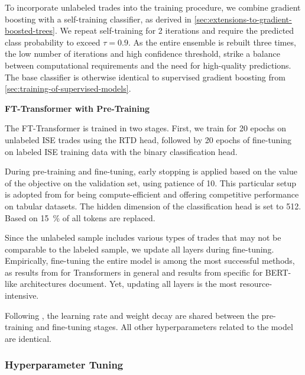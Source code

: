 To incorporate unlabeled trades into the training procedure, we combine gradient boosting with a self-training classifier, as derived in \cref{sec:extensions-to-gradient-boosted-trees}. We repeat self-training for 2 iterations and require the predicted class probability to exceed $\tau=0.9$. As the entire ensemble is rebuilt three times, the low number of iterations and high confidence threshold, strike a balance between computational requirements and the need for high-quality predictions. The base classifier is otherwise identical to supervised gradient boosting from \cref{sec:training-of-supervised-models}.

\textbf{FT-Transformer with Pre-Training}

The FT-Transformer is trained in two stages. First, we train for \num{20} epochs on unlabeled \gls{ISE} trades using the \gls{RTD} head, followed by \num{20} epochs of fine-tuning on labeled \gls{ISE} training data with the binary classification head.

During pre-training and fine-tuning, early stopping is applied based on the value of the objective on the validation set, using patience of \num{10}. This particular setup is adopted from \textcite[\checkmark][15]{rubachevRevisitingPretrainingObjectives2022} for being compute-efficient and offering competitive performance on tabular datasets. The hidden dimension of the classification head is set to \num{512}. Based on \textcite[][3]{clarkElectraPretrainingText2020} \SI{15}{\percent} of all tokens are replaced.

Since the unlabeled sample includes various types of trades that may not be comparable to the labeled sample, we update all layers during fine-tuning. Empirically, fine-tuning the entire model is among the most successful methods, as results from \textcite[\checkmark][104--105]{raeScalingLanguageModels2022} for Transformers in general and results from \autocite[][7]{merchantWhatHappensBERT2020} specific for \gls{BERT}-like architectures document. Yet, updating all layers is the most resource-intensive.

Following \textcite[\checkmark][4]{rubachevRevisitingPretrainingObjectives2022}, the learning rate and weight decay are shared between the pre-training and fine-tuning stages. All other hyperparameters related to the model are identical.

\subsubsection{Hyperparameter Tuning}\label{sec:hyperparameter-tuning}

